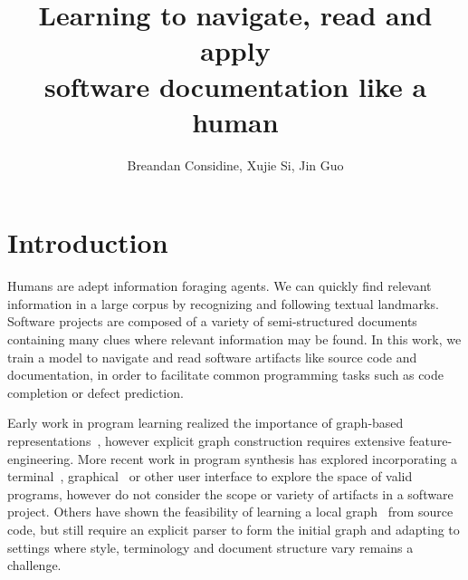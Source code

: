 \documentclass[11pt]{article}
\title{Learning to navigate, read and apply\\software documentation like a human}
\author{Breandan Considine, Xujie Si, Jin Guo}
\begin{document}
\maketitle

\section{Introduction}

Humans are adept information foraging agents. We can quickly find relevant information in a large corpus by recognizing and following textual landmarks. Software projects are composed of a variety of semi-structured documents containing many clues where relevant information may be found. In this work, we train a model to navigate and read software artifacts like source code and documentation, in order to facilitate common programming tasks such as code completion or defect prediction.


Early work in program learning realized the importance of graph-based representations~\citep{allamanis2017learning}, however explicit graph construction requires extensive feature-engineering. More recent work in program synthesis has explored incorporating a terminal~\citep{ellis2019write}, graphical~\citep{walke2020learning} or other user interface to explore the space of valid programs, however do not consider the scope or variety of artifacts in a software project. Others have shown the feasibility of learning a local graph~\citep{johnson2020learning} from source code, but still require an explicit parser to form the initial graph and adapting to settings where style, terminology and document structure vary remains a challenge.

\end{document}
